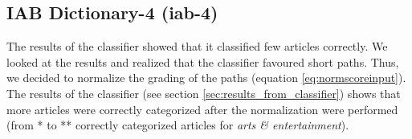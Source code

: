 \subsection{IAB Dictionary-4 (iab-4)}
The results of the classifier showed that it classified few articles correctly. We looked at the results and realized that the classifier favoured short paths. Thus, we decided to normalize the grading of the paths (equation \ref{eq:normscoreinput}). The results of the classifier (see section \ref{sec:results_from_classifier}) shows that more articles were correctly categorized after the normalization were performed (from * to ** correctly categorized articles for \emph{arts \& entertainment}). 

